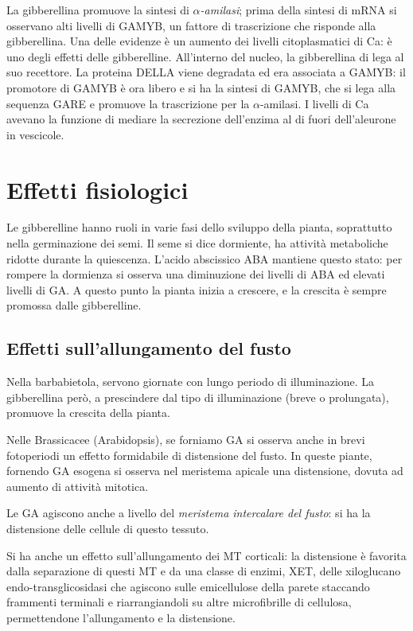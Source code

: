 \documentclass[a4paper,12pt]{book}
\begin{document}
La gibberellina promuove la sintesi di \emph{$\alpha$-amilasi}; prima della sintesi di mRNA si osservano alti livelli di GAMYB, un fattore di trascrizione che risponde alla gibberellina. Una delle evidenze è un aumento dei livelli citoplasmatici di Ca: è uno degli effetti delle gibberelline. All'interno del nucleo, la gibberellina di lega al suo recettore. La proteina DELLA viene degradata ed era associata a GAMYB: il promotore di GAMYB è ora libero e si ha la sintesi di GAMYB, che si lega alla sequenza GARE e promuove la trascrizione per la $\alpha$-amilasi. I livelli di Ca avevano la funzione di mediare la secrezione dell'enzima al di fuori dell'aleurone in vescicole.

\section{Effetti fisiologici}
Le gibberelline hanno ruoli in varie fasi dello sviluppo della pianta, soprattutto nella germinazione dei semi. Il seme si dice dormiente, ha attività metaboliche ridotte durante la quiescenza. L'acido abscissico ABA mantiene questo stato: per rompere la dormienza si osserva una diminuzione dei livelli di ABA ed elevati livelli di GA. A questo punto la pianta inizia a crescere, e la crescita è sempre promossa dalle gibberelline.

\subsection{Effetti sull'allungamento del fusto}
Nella barbabietola, servono giornate con lungo periodo di illuminazione. La gibberellina però, a prescindere dal tipo di illuminazione (breve o prolungata), promuove la crescita della pianta. 

Nelle Brassicacee (Arabidopsis), se forniamo GA si osserva anche in brevi fotoperiodi un effetto formidabile di distensione del fusto. In queste piante, fornendo GA esogena si osserva nel meristema apicale una distensione, dovuta ad aumento di attività mitotica.

Le GA agiscono anche a livello del \emph{meristema intercalare del fusto}: si ha la distensione delle cellule di questo tessuto. 

Si ha anche un effetto sull'allungamento dei MT corticali: la distensione è favorita dalla separazione di questi MT e da una classe di enzimi, XET, delle xiloglucano endo-transglicosidasi che agiscono sulle emicellulose della parete staccando frammenti terminali e riarrangiandoli su altre microfibrille di cellulosa, permettendone l'allungamento e la distensione.
\end{document}
